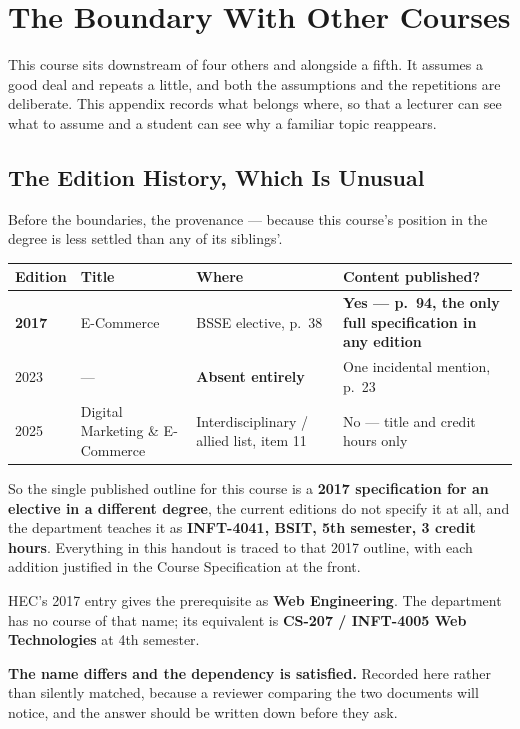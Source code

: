 \chapter{The Boundary With Other Courses}\label{app:boundary}
\normalfigures

This course sits downstream of four others and alongside a fifth. It assumes a
good deal and repeats a little, and both the assumptions and the repetitions
are deliberate. This appendix records what belongs where, so that a lecturer
can see what to assume and a student can see why a familiar topic reappears.

\section{The Edition History, Which Is Unusual}

Before the boundaries, the provenance --- because this course's position in the
degree is less settled than any of its siblings'.

\begin{longtable}{@{}L{1.8cm}L{5.0cm}L{3.0cm}L{4.6cm}@{}}
\toprule
{}
\textbf{Edition} & \textbf{Title} & \textbf{Where} & \textbf{Content
published?} \\
\midrule
\endhead
\textbf{2017} & E-Commerce & BSSE elective, p.~38 & \textbf{Yes --- p.~94, the
only full specification in any edition} \\
2023 & --- & \textbf{Absent entirely} & One incidental mention, p.~23 \\
2025 & Digital Marketing \& E-Commerce & Interdisciplinary / allied list,
item 11 & No --- title and credit hours only \\
\bottomrule
\end{longtable}

\smallskip
So the single published outline for this course is a \textbf{2017 specification
for an elective in a different degree}, the current editions do not specify it
at all, and the department teaches it as \textbf{INFT-4041, BSIT, 5th
semester, 3 credit hours}. Everything in this handout is traced to that 2017
outline, with each addition justified in the Course Specification at the front.

\begin{alertbox}
HEC's 2017 entry gives the prerequisite as \textbf{Web Engineering}. The
department has no course of that name; its equivalent is \textbf{CS-207 /
INFT-4005 Web Technologies} at 4th semester.

\smallskip
\textbf{The name differs and the dependency is satisfied.} Recorded here rather
than silently matched, because a reviewer comparing the two documents will
notice, and the answer should be written down before they ask.
\end{alertbox}

